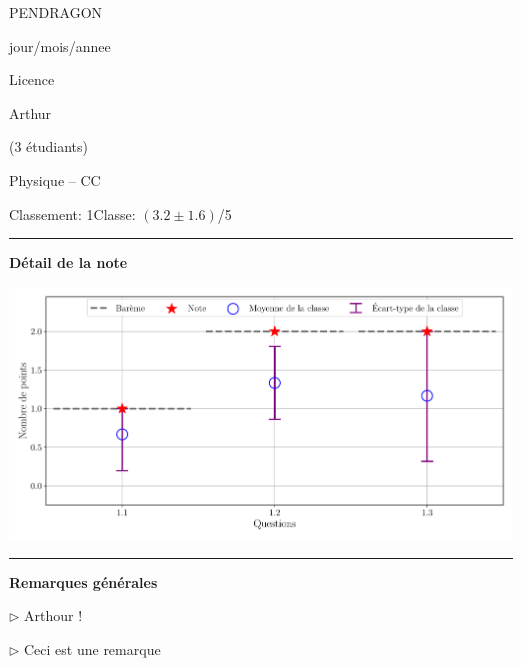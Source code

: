 \documentclass[12pt, a4paper]{article}
\begin{document}
\pagestyle{empty}
\noindent\begin{minipage}[c]{0.31\linewidth}\noindent PENDRAGON\end{minipage}\hfill
\begin{minipage}[c]{0.31\linewidth}\centering jour/mois/annee \end{minipage}\hfill
\begin{minipage}[c]{0.31\linewidth}\hfill Licence \end{minipage}\hfill

\noindent\begin{minipage}[c]{0.31\linewidth}\noindent Arthur\end{minipage}\hfill
\begin{minipage}[c]{0.31\linewidth}\hfill(3 étudiants)\end{minipage}
\begin{center} Physique -- CC\bigskip

{\Large\bf {}}\end{center}

\vspace*{-0.7cm}\noindent Classement: 1\hfill Classe:  $\left(3.2 \pm 1.6\right)$/5
\noindent\rule{\linewidth}{.7pt}\begin{center}{\large\bf Détail de la note}\end{center}

\begin{center}
\includegraphics[keepaspectratio, width=\linewidth]{./output/PENDRAGON_Arthur_GradeStats.pdf}\end{center}


\noindent\rule{\linewidth}{.7pt}\begin{center}{\large\bf Remarques générales}\end{center}

$\triangleright$\xspace Arthour !

$\triangleright$\xspace Ceci est une remarque
\end{document}
